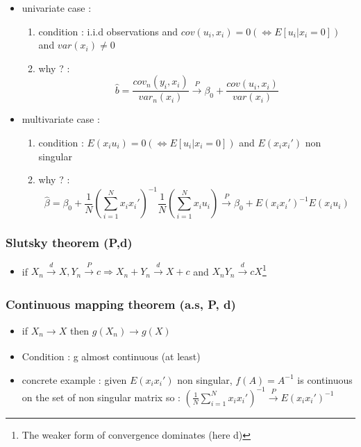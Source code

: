 \documentclass{article}
\begin{document}
\begin{consbox}
    \begin{itemize}
        \item univariate case : 
        \begin{enumerate}
            \item condition : i.i.d observations and $cov(u_i,x_i) =0 (\Longleftrightarrow E[u_i|x_i=0])$ and $var(x_i)\neq0$
            \item why ? : 
\begin{equation}
    \hat{b} = \frac{cov_n(y_i,x_i)}{var_n(x_i)} \xrightarrow[]{P} \beta_0 + \frac{cov(u_i,x_i)}{var(x_i)}
\end{equation}
        \end{enumerate}
        \item multivariate case : 
        \begin{enumerate}
            \item condition : $E(x_iu_i)=0(\Longleftrightarrow E[u_i|x_i=0])$ and $E(x_ix_i')$ non singular
            \item why ? : 
\begin{equation}
    \hat{\beta} = \beta_0 + \frac{1}{N}(\sum_{i=1}^Nx_ix_i')^{-1}\frac{1}{N}(\sum_{i=1}^Nx_iu_i) \xrightarrow[]{P} \beta_0 + E(x_ix_i')^{-1}E(x_iu_i)
\end{equation}
        \end{enumerate}
    \end{itemize}
\end{consbox}

\subsubsection{Slutsky theorem (P,d)}
\begin{itemize}
    \item if $X_n\xrightarrow[]{d}X, Y_n\xrightarrow[]{P}c \Longrightarrow X_n+Y_n \xrightarrow[]{d}X+c$ and $X_nY_n\xrightarrow[]{d} cX$\footnote{The weaker form of convergence dominates (here d)}
\end{itemize}
\subsubsection{Continuous mapping theorem (a.s, P, d)}
\begin{itemize}
    \item if $X_n\xrightarrow{}X$ then $g(X_n)\xrightarrow[]{}g(X)$
    \item Condition : g almost continuous (at least)
    \item concrete example : given $E(x_ix_i')$ non singular, $f(A) = A^{-1}$ is continuous on the set of non singular matrix so : $(\frac{1}{N}\sum_{i=1}^Nx_ix_i')^{-1} \xrightarrow[]{P}E(x_ix_i')^{-1}$
\end{itemize}
\end{document}
